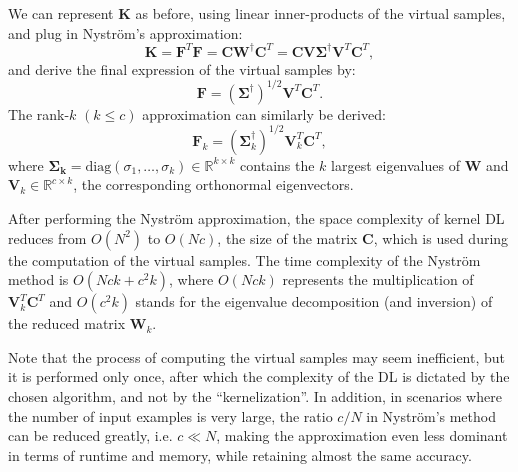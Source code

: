 \documentclass[journal]{IEEEtran}
\newcommand{\bK}{\mathbf{K}}
\newcommand{\bF}{\mathbf{F}}
\newcommand{\bC}{\mathbf{C}}
\newcommand{\bW}{\mathbf{W}}
\newcommand{\bV}{\mathbf{V}}
\begin{document}
We can represent $\bK$ as before, using linear inner-products of the virtual samples, and plug in Nystr\"{o}m's approximation:
\begin{equation}\label{eq:Nystrom2}
\bK = \bF^T \bF = \bC \bW^{\dagger} \bC^T = \bC \bV \boldsymbol{\Sigma}^{\dagger} \bV^T \bC^T,
\end{equation}
and derive the final expression of the virtual samples by:
\begin{equation}\label{eq:Nystrom3}
\bF = (\boldsymbol{\Sigma}^{\dagger})^{1/2} \bV^T \bC^T.
\end{equation}
The rank-$k$ $(k \leq c)$ approximation can similarly be derived:
\begin{equation}\label{eq:VirtualSamplesConcluded}
     \bF_k = \left(\boldsymbol{\Sigma}_k^{\dagger} \right)^{1/2} \mathbf{V}_k^T \bC^T,
\end{equation}
where $\boldsymbol{\Sigma_k}=\text{diag}(\sigma_1,\ldots,\sigma_k) \in \mathbb{R}^{k \times k}$ contains the $k$ largest eigenvalues of $\bW$ and $\bV_k \in \mathbb{R}^{c \times k}$, the corresponding orthonormal eigenvectors.

After performing the Nystr\"{o}m approximation, the space complexity of kernel DL reduces from $O(N^2)$ to $O(Nc)$, the size of the matrix $\bC$, which is used during the computation of the virtual samples. The time complexity of the Nystr\"{o}m method is $O(Nck+c^2k)$, where $O(Nck)$ represents the multiplication of $\mathbf{V}_k^T \bC^T$ and $O(c^2k)$ stands for the eigenvalue decomposition (and inversion) of the reduced matrix $\bW_k$.

Note that the process of computing the virtual samples may seem inefficient, but it is performed only once, after which the complexity of the DL is dictated by the chosen algorithm, and not by the ``kernelization''. In addition, in scenarios where the number of input examples is very large, the ratio $c/N$ in Nystr\"{o}m's method can be reduced greatly, i.e. $c \ll N$, making the approximation even less dominant in terms of runtime and memory, while retaining almost the same accuracy.
\end{document}

